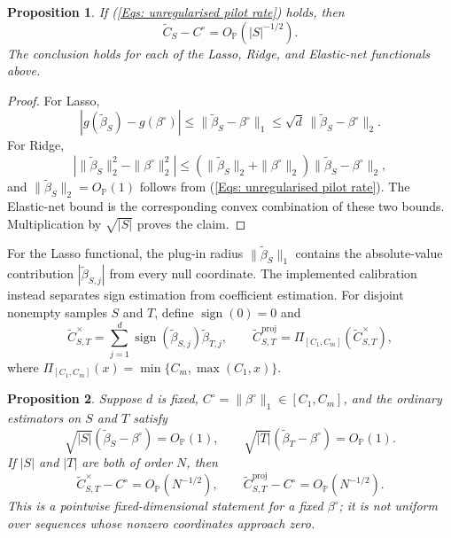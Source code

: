 \documentclass[12pt]{article}
\newenvironment{bluechange}{\begingroup\color[rgb]{0.00,0.00,1.00}}{\endgroup}
\newtheorem{proposition}{Proposition}
\theoremstyle{remark}
\theoremstyle{plain}
\begin{document}
\begin{bluechange}
\begin{proposition}\label{Prop: unregularised pilot radius}
If (\ref{Eqs: unregularised pilot rate}) holds, then
\[
\widetilde C_S-C^\circ=O_{\mathbb P}(|S|^{-1/2}).
\]
The conclusion holds for each of the Lasso, Ridge, and Elastic-net functionals above.
\end{proposition}

\begin{proof}
For Lasso,
\[
|g(\widetilde\beta_S)-g(\beta^\circ)|
\le \|\widetilde\beta_S-\beta^\circ\|_1
\le \sqrt d\,\|\widetilde\beta_S-\beta^\circ\|_2.
\]
For Ridge,
\[
\left|\|\widetilde\beta_S\|_2^2-\|\beta^\circ\|_2^2\right|
\le(\|\widetilde\beta_S\|_2+\|\beta^\circ\|_2)
\|\widetilde\beta_S-\beta^\circ\|_2,
\]
and $\|\widetilde\beta_S\|_2=O_{\mathbb P}(1)$ follows from (\ref{Eqs: unregularised pilot rate}). The Elastic-net bound is the corresponding convex combination of these two bounds. Multiplication by $\sqrt{|S|}$ proves the claim.
\end{proof}

For the Lasso functional, the plug-in radius $\|\widetilde\beta_S\|_1$ contains the absolute-value contribution $|\widetilde\beta_{S,j}|$ from every null coordinate. The implemented calibration instead separates sign estimation from coefficient estimation. For disjoint nonempty samples $S$ and $T$, define $\operatorname{sign}(0)=0$ and
\begin{equation}\label{Eqs: cross signed radius}
\widetilde C_{S,T}^{\times}
=\sum_{j=1}^d
\operatorname{sign}(\widetilde\beta_{S,j})\widetilde\beta_{T,j},
\qquad
\widetilde C_{S,T}^{\mathrm{proj}}
=\Pi_{[C_1,C_m]}(\widetilde C_{S,T}^{\times}),
\end{equation}
where $\Pi_{[C_1,C_m]}(x)=\min\{C_m,\max(C_1,x)\}$.

\begin{proposition}\label{Prop: cross signed pilot radius}
Suppose $d$ is fixed, $C^\circ=\|\beta^\circ\|_1\in[C_1,C_m]$, and the ordinary estimators on $S$ and $T$ satisfy
\[
\sqrt{|S|}(\widetilde\beta_S-\beta^\circ)=O_{\mathbb P}(1),
\qquad
\sqrt{|T|}(\widetilde\beta_T-\beta^\circ)=O_{\mathbb P}(1).
\]
If $|S|$ and $|T|$ are both of order $N$, then
\[
\widetilde C_{S,T}^{\times}-C^\circ=O_{\mathbb P}(N^{-1/2}),
\qquad
\widetilde C_{S,T}^{\mathrm{proj}}-C^\circ=O_{\mathbb P}(N^{-1/2}).
\]
This is a pointwise fixed-dimensional statement for a fixed $\beta^\circ$; it is not uniform over sequences whose nonzero coordinates approach zero.
\end{proposition}


\end{bluechange}
\end{document}
